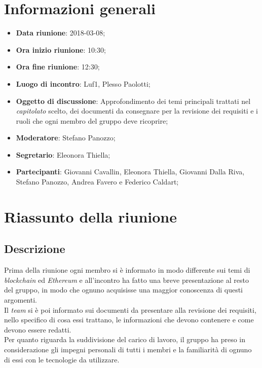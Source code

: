 \section{Informazioni generali}
	\begin{itemize}
		\item \textbf{Data riunione}: 2018-03-08;
		\item \textbf{Ora inizio riunione}: 10:30;
		\item \textbf{Ora fine riunione}: 12:30;
		\item \textbf{Luogo di incontro}: Luf1, Plesso Paolotti;
		\item \textbf{Oggetto di discussione}: Approfondimento dei temi principali trattati nel \emph{capitolato} scelto, dei documenti da consegnare per la revisione dei requisiti e i ruoli che ogni membro del gruppo deve ricoprire;
		\item \textbf{Moderatore}: Stefano Panozzo;
		\item \textbf{Segretario}: Eleonora Thiella;
		\item \textbf{Partecipanti}: Giovanni Cavallin, Eleonora Thiella, Giovanni Dalla Riva, Stefano Panozzo, Andrea Favero e Federico Caldart;
	\end{itemize}

\section{Riassunto della riunione}
	\subsection{Descrizione}
	Prima della riunione ogni membro si è informato in modo differente sui temi di \emph{blockchain} ed \emph{Ethereum} e all'incontro ha fatto una breve presentazione al resto del gruppo, in modo che ognuno acquisisse una maggior conoscenza di questi argomenti.
	\\Il \emph{team} si è poi informato sui documenti da presentare alla revisione dei requisiti, nello specifico di cosa essi trattano, le informazioni che devono contenere e come devono essere redatti.
	\\Per quanto riguarda la suddivisione del carico di lavoro, il gruppo ha preso in considerazione gli impegni personali di tutti i membri e la familiarità di ognuno di essi con le tecnologie da utilizzare.
